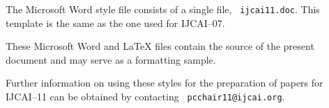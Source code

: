 \documentclass{article}
\begin{document}
The Microsoft Word style file consists of a single file, {\tt
ijcai11.doc}. This template is the same as the one used for
IJCAI--07.

These Microsoft Word and \LaTeX{} files contain the source of the
present document and may serve as a formatting sample.  

Further information on using these styles for the preparation of
papers for IJCAI--11 can be obtained by contacting {\tt
pcchair11@ijcai.org}.



\end{document}
